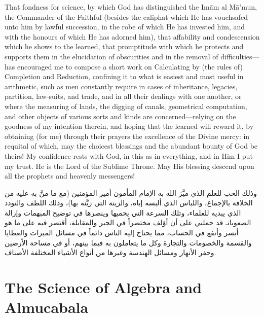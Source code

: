\documentclass[11pt,a4paper]{book}
\begin{document}
That fondness for science, by which God has distinguished the Im\=am al
M\=a'mun, the Commander of the Faithful (besides the caliphat which He has
vouchsafed unto him by lawful succession, in the robe of which He has invested
him, and with the honours of which He has adorned him), that affability and
condescension which he shows to the learned, that promptitude with which he
protects and supports them in the elucidation of obscurities and in the
removal of difficulties---has encouraged me to compose a short work on
Calculating by (the rules of) Completion and Reduction, confining it to what
is easiest and most useful in arithmetic, such as men constantly require in
cases of inheritance, legacies, partition, law-suits, and trade, and in all
their dealings with one another, or where the measuring of lands, the digging
of canals, geometrical computation, and other objects of various sorts and
kinds are concerned---relying on the goodness of my intention therein, and
hoping that the learned will reward it, by obtaining (for me) through their
prayers the excellence of the Divine mercy: in requital of which, may the
choicest blessings and the abundant bounty of God be theirs! My confidence
rests with God, in this as in everything, and in Him I put my trust. He is
the Lord of the Sublime Throne. May His blessing descend upon all the
prophets and heavenly messengers!

\begin{arabicbox}
\begin{Arabic}
وذلك الحب للعلم الذي ميَّز الله به الإمام المأمون أمير المؤمنين
(مع ما منَّ به عليه من الخلافة بالإجماع، واللباس الذي ألبسه
إياه، والزينة التي زيَّنه بها)، وذلك اللطف والتودد الذي يبديه
للعلماء، وتلك السرعة التي يحميها وينصرها في توضيح المبهمات
وإزالة الصعوباتـ قد حملني على أن أؤلف مختصراً في الجبر
والمقابلة، أقتصر فيه على ما هو أيسر وأنفع في الحساب، مما
يحتاج إليه الناس دائماً في مسائل الميراث والعطايا والقسمة
والخصومات والتجارة وكل ما يتعاملون به فيما بينهم، أو في
مساحة الأرضين وحفر الأنهار ومسائل الهندسة وغيرها من
أنواع الأشياء المختلفة الأصناف.
\end{Arabic}
\end{arabicbox}

\newpage

\part{The Science of Algebra and Almucabala}
\label{part:algebra}
\end{document}

